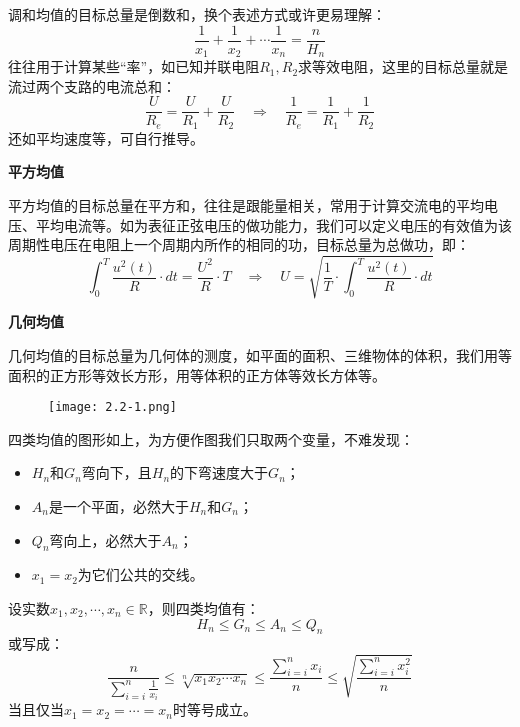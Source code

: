 调和均值的目标总量是倒数和，换个表述方式或许更易理解：
\[
\frac{1}{x_1}+\frac{1}{x_2}+\cdots \frac{1}{x_n}=\frac{n}{H_n}
\]
往往用于计算某些“率”，如已知并联电阻$R_1,R_2$求等效电阻，这里的目标总量就是流过两个支路的电流总和：
\[
\frac{U}{R_e}=\frac{U}{R_1}+\frac{U}{R_2} \quad \Rightarrow \quad \frac{1}{R_e}=\frac{1}{R_1}+\frac{1}{R_2}
\]
还如平均速度等，可自行推导。

{\bf 平方均值}

平方均值的目标总量在平方和，往往是跟能量相关，常用于计算交流电的平均电压、平均电流等。如为表征正弦电压的做功能力，我们可以定义电压的有效值为该周期性电压在电阻上一个周期内所作的相同的功，目标总量为总做功，即：
\[
\int_0^T{\frac{u^2\left( t \right)}{R}\cdot dt}=\frac{U^2}{R}\cdot T \quad \Rightarrow \quad U=\sqrt{\frac{1}{T}\cdot \int_0^T{\frac{u^2\left( t \right)}{R}\cdot dt}}
\]

{\bf 几何均值}

几何均值的目标总量为几何体的测度，如平面的面积、三维物体的体积，我们用等面积的正方形等效长方形，用等体积的正方体等效长方体等。

\begin{figure}[h]
\centering
\texttt{[image: 2.2-1.png]}
\end{figure}

四类均值的图形如上，为方便作图我们只取两个变量，不难发现：
\begin{itemize}
    \item $H_n$和$G_n$弯向下，且$H_n$的下弯速度大于$G_n$；
    \item $A_n$是一个平面，必然大于$H_n$和$G_n$；
    \item $Q_n$弯向上，必然大于$A_n$；
    \item $x_1=x_2$为它们公共的交线。
\end{itemize}

\begin{theorem}[均值不等式定理]
设实数$x_1,x_2,\cdots ,x_n\in \mathbb{R} $，则四类均值有：
\[
H_n\leqslant G_n\leqslant A_n\leqslant Q_n
\]
或写成：
\[
\frac{n}{\sum_{i=i}^n{\frac{1}{x_i}}}\leqslant \sqrt[n]{x_1x_2\cdots x_n}\leqslant \frac{\sum_{i=i}^n{x_i}}{n}\leqslant \sqrt{\frac{\sum_{i=i}^n{x_{i}^{2}}}{n}}
\]
当且仅当$x_1=x_2=\cdots =x_n$时等号成立。
\end{theorem}

